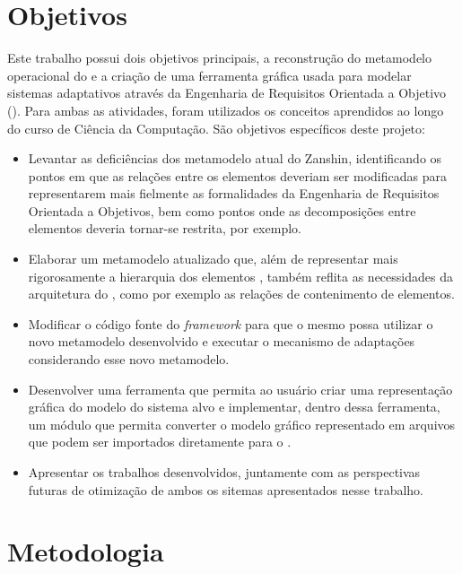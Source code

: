 \section{Objetivos}
\label{sec-intro-objetivos}

Este trabalho possui dois objetivos principais, a reconstrução do metamodelo operacional do \zanshin e a criação de uma ferramenta gráfica usada para modelar sistemas adaptativos através da Engenharia de Requisitos Orientada a Objetivo (\gore). Para ambas as atividades, foram utilizados os conceitos aprendidos ao longo do curso de Ciência da Computação. São objetivos específicos deste projeto:

\begin{itemize}
	
	\item Levantar as deficiências dos metamodelo atual do Zanshin, identificando os pontos em que as relações entre os elementos deveriam ser modificadas para representarem mais fielmente as formalidades da Engenharia de Requisitos Orientada a Objetivos, bem como pontos onde as decomposições entre elementos deveria tornar-se restrita, por exemplo. 
	
	\item Elaborar um metamodelo atualizado que, além de representar mais rigorosamente a hierarquia dos elementos \gore, também reflita as necessidades da arquitetura do \zanshin, como por exemplo as relações de contenimento de elementos.
	
	\item Modificar o código fonte do \textit{framework} para que o mesmo possa utilizar o novo metamodelo desenvolvido e executar o mecanismo de adaptações considerando esse novo metamodelo.
	
	\item Desenvolver uma ferramenta que permita ao usuário criar uma representação gráfica do modelo do sistema alvo e implementar, dentro dessa ferramenta, um módulo que permita converter o modelo gráfico representado em arquivos \xml que podem ser importados diretamente para o \zanshin.
	
	\item Apresentar os trabalhos desenvolvidos, juntamente com as perspectivas futuras de otimização de ambos os sitemas apresentados nesse trabalho.

\end{itemize}


\section{Metodologia}
\label{sec-intro-metodologia}

